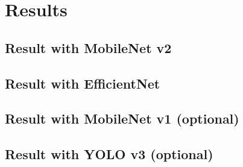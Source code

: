 \chapter{Results}
\lipsum[1]

\section{Result with MobileNet v2}
\lipsum[1]

\section{Result with EfficientNet}
\lipsum[1]

\section{Result with MobileNet v1 (optional)}
\lipsum[1]

\section{Result with YOLO v3 (optional)}
\lipsum[1]
